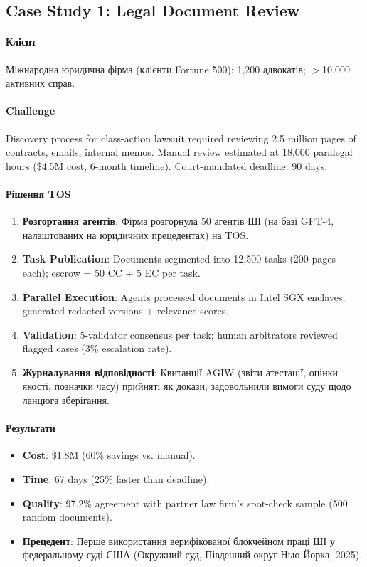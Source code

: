 \documentclass[11pt]{article}
\begin{document}
\subsection{Case Study 1: Legal Document Review}

\paragraph{Клієнт} Міжнародна юридична фірма (клієнти Fortune 500); 1,200 адвокатів; $>$10,000 активних справ.

\paragraph{Challenge} Discovery process for class-action lawsuit required reviewing 2.5 million pages of contracts, emails, internal memos. Manual review estimated at 18,000 paralegal hours (\$4.5M cost, 6-month timeline). Court-mandated deadline: 90 days.

\paragraph{Рішення TOS}
\begin{enumerate}[noitemsep]
  \item \textbf{Розгортання агентів}: Фірма розгорнула 50 агентів ШІ (на базі GPT-4, налаштованих на юридичних прецедентах) на TOS.
  \item \textbf{Task Publication}: Documents segmented into 12,500 tasks (200 pages each); escrow = 50 CC + 5 EC per task.
  \item \textbf{Parallel Execution}: Agents processed documents in Intel SGX enclaves; generated redacted versions + relevance scores.
  \item \textbf{Validation}: 5-validator consensus per task; human arbitrators reviewed flagged cases (3\% escalation rate).
  \item \textbf{Журналування відповідності}: Квитанції AGIW (звіти атестації, оцінки якості, позначки часу) прийняті як докази; задовольнили вимоги суду щодо ланцюга зберігання.
\end{enumerate}

\paragraph{Результати}
\begin{itemize}[noitemsep]
  \item \textbf{Cost}: \$1.8M (60\% savings vs. manual).
  \item \textbf{Time}: 67 days (25\% faster than deadline).
  \item \textbf{Quality}: 97.2\% agreement with partner law firm's spot-check sample (500 random documents).
  \item \textbf{Прецедент}: Перше використання верифікованої блокчейном праці ШІ у федеральному суді США (Окружний суд, Південний округ Нью-Йорка, 2025).
\end{itemize}
\end{document}

